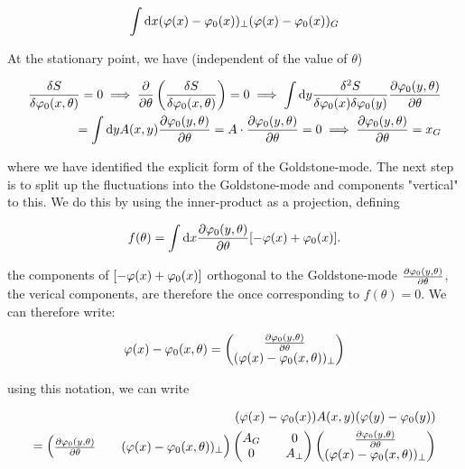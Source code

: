 \begin{align*}
    \int \dd x (\varphi(x) - \varphi_0(x))_{\perp} (\varphi(x) - \varphi_0(x))_G
\end{align*}

At the stationary point, we have (independent of the value of $\theta$) 

\begin{align*}
    \fdv{S}{\p_0(x,\theta)} = 0 \implies \pdv{}{\theta} \left(\fdv{S}{\p_0(x,\theta)}  \right) = 0 
    \implies \int \dd y \fdv{^2S}{\p_0(x) \delta \p_0(y)} \pdv{\p_0(y,\theta)}{\theta} \\ 
    = \int \dd y A(x,y)\pdv{\p_0(y,\theta)}{\theta} = A \cdot \pdv{\p_0(y,\theta)}{\theta} = 0 
    \implies \pdv{\p_0(y,\theta)}{\theta} = x_G
\end{align*}

where we have identified the explicit form of the Goldstone-mode. The next step is to split up the fluctuations into the Goldstone-mode and components "vertical" to this. We do this by using the inner-product as a projection, defining 

\begin{equation*}
    f(\theta) = \int \dd x \pdv{\varphi_0(y,\theta)}{\theta} [-\varphi(x) + \varphi_0(x)].
\end{equation*}

the components of $[-\varphi(x) + \varphi_0(x)]$ orthogonal to the Goldstone-mode $\pdv{\varphi_0(y,\theta)}{\theta}$, the verical components, are therefore the once corresponding to $f(\theta) = 0$. We can therefore write: 

\begin{align*}
    \varphi(x) - \varphi_0(x,\theta) = \begin{pmatrix} \pdv{\varphi_0(y,\theta)}{\theta} \\ (\varphi(x) - \varphi_0(x,\theta))_{\perp} \end{pmatrix}
\end{align*}

using this notation, we can write 

\begin{align*}
    (\varphi(x) - \varphi_0(x)) A(x,y) (\varphi(y) - \varphi_0(y)) \\ 
    = \begin{pmatrix} \pdv{\varphi_0(y,\theta)}{\theta} && (\varphi(x) - \varphi_0(x,\theta))_{\perp} \end{pmatrix} \begin{pmatrix} A_G && 0 \\ 0 && A_{\perp} \end{pmatrix} \begin{pmatrix} \pdv{\varphi_0(y,\theta)}{\theta} \\ (\varphi(x) - \varphi_0(x,\theta))_{\perp} \end{pmatrix}
\end{align*}

